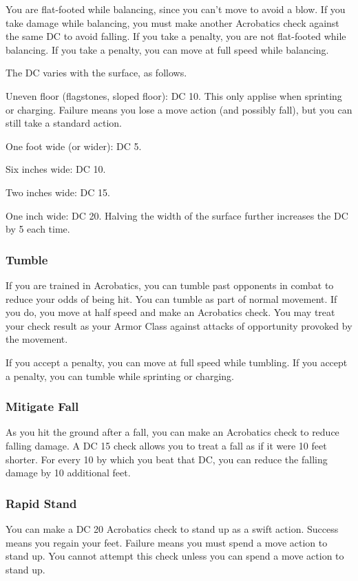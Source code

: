 You are flat-footed while balancing, since you can't move to avoid a blow. If you take damage while balancing, you must make another Acrobatics check against the same DC to avoid falling. If you take a  penalty, you are not flat-footed while balancing. If you take a  penalty, you can move at full speed while balancing.

The DC varies with the surface, as follows.

\begin{itemize*}
  \item Uneven floor (flagstones, sloped floor): DC 10. This only applise when sprinting or charging. Failure means you lose a move action (and possibly fall), but you can still take a standard action.
  \item One foot wide (or wider): DC 5. 
  \item Six inches wide: DC 10.
  \item Two inches wide: DC 15.
  \item One inch wide: DC 20. Halving the width of the surface further increases the DC by 5 each time.
\end{itemize*}

\subsubsection{Tumble}
If you are trained in Acrobatics, you can tumble past opponents in combat to reduce your odds of being hit. You can tumble as part of normal movement. If you do, you move at half speed and make an Acrobatics check. You may treat your check result as your Armor Class against attacks of opportunity provoked by the movement.

If you accept a  penalty, you can move at full speed while tumbling. If you accept a  penalty, you can tumble while sprinting or charging.

\subsubsection{Mitigate Fall}
As you hit the ground after a fall, you can make an Acrobatics check to reduce falling damage. A DC 15 check allows you to treat a fall as if it were 10 feet shorter. For every 10 by which you beat that DC, you can reduce the falling damage by 10 additional feet.

\subsubsection{Rapid Stand}
You can make a DC 20 Acrobatics check to stand up as a swift action. Success means you regain your feet. Failure means you must spend a move action to stand up. You cannot attempt this check unless you can spend a move action to stand up. 

